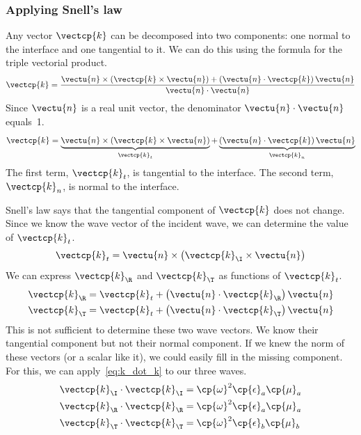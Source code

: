 \begin{refsection}
\subsubsection{Applying Snell's law}
\label{sec:applying_snells_law}
Any vector $\vectcp{k}$ can be decomposed into two components: one normal to the interface and one tangential to it.
We can do this using the formula for the triple vectorial product.
\begin{equation}
    \vectcp{k}
    =
    \frac{
        \vectu{n} \times \left(\vectcp{k} \times \vectu{n}\right)
        +
        \left(\vectu{n} \cdot \vectcp{k}\right) \vectu{n}
    }{
        \vectu{n} \cdot \vectu{n}
    }
\end{equation}
Since $\vectu{n}$ is a real unit vector, the denominator $\vectu{n} \cdot \vectu{n}$ equals~1.
\begin{equation}
    \vectcp{k}
    =
    \underbrace{\vectu{n} \times \left(\vectcp{k} \times \vectu{n}\right)}_{\vectcp{k}_t}
    +
    \underbrace{\left(\vectu{n} \cdot \vectcp{k}\right) \vectu{n}}_{\vectcp{k}_n}
\end{equation}
The first term, $\vectcp{k}_t$, is tangential to the interface.
The second term, $\vectcp{k}_n$, is normal to the interface.

Snell's law says that the tangential component of $\vectcp{k}$ does not change.
Since we know the wave vector of the incident wave, we can determine the value of $\vectcp{k}_t$.
\begin{equation}
    \vectcp{k}_t = \vectu{n} \times \left(\vectcp{k}_\I \times \vectu{n}\right)
\end{equation}
We can express $\vectcp{k}_\R$ and $\vectcp{k}_\T$ as functions of $\vectcp{k}_t$.
\begin{align}
    \vectcp{k}_\R &= \vectcp{k}_t + \left(\vectu{n} \cdot \vectcp{k}_\R\right)\vectu{n}
    \\
    \vectcp{k}_\T &= \vectcp{k}_t + \left(\vectu{n} \cdot \vectcp{k}_\T\right)\vectu{n}
\end{align}
This is not sufficient to determine these two wave vectors.
We know their tangential component but not their normal component.
If we knew the norm of these vectors (or a scalar like it), we could easily fill in the missing component.
For this, we can apply~\cref{eq:k_dot_k} to our three waves.
\begin{align}
    \vectcp{k}_\I \cdot \vectcp{k}_\I &= \cp{\omega}^2 \cp{\epsilon}_a \cp{\mu}_a \\
    \vectcp{k}_\R \cdot \vectcp{k}_\R &= \cp{\omega}^2 \cp{\epsilon}_a \cp{\mu}_a \\
    \vectcp{k}_\T \cdot \vectcp{k}_\T &= \cp{\omega}^2 \cp{\epsilon}_b \cp{\mu}_b
\end{align}


\end{refsection}
